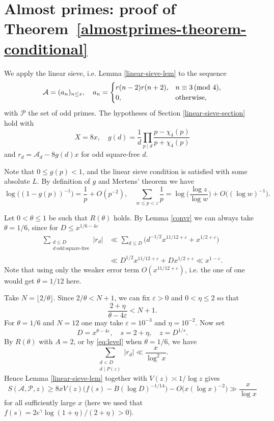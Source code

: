 \documentclass[12pt]{amsart}
\theoremstyle{remark}
\renewcommand{\pmod}[1]{\mkern3mu(\mathrm{mod}\ #1)}
\begin{document}
\section{Almost primes: proof of Theorem~\ref{almostprimes-theorem-conditional}}\label{sieve-section}

We apply the linear sieve, i.e. Lemma \ref{linear-sieve-lem} to the sequence
\[
    \mathcal A = (a_n)_{n \le x}, \quad a_n = \begin{cases}
                                                    r(n-2)r(n+2),&n \equiv 3 \pmod 4,\\ 0,&\text{otherwise},
                                                \end{cases}
\]
with $\mathcal P$ the set of odd primes. The hypotheses of Section \ref{linear-sieve-section} hold with
\[
    X = 8x,\quad g(d) = \frac{1}{d} \prod_{p \mid d}\frac{p-\chi_4(p)}{p+\chi_4(p)}
\]
and $r_d = \mathcal A_d-8g(d)x$ for odd square-free $d$.

Note that $0 \le g(p) < 1$, and the linear sieve condition is satisfied with some absolute $L$. 
By definition of $g$ and Mertens' theorem we have
\[
    \log\bigl((1-g(p))^{-1}\bigr) = \frac{1}{p}+O(p^{-2}), \quad \sum_{w \le p < z}\frac{1}{p} = \log\biggl(\frac{\log z}{\log w}\biggr)+O\bigl((\log w)^{-1}\bigr).
\]

Let $0 < \theta \le 1$ be such that $R(\theta)$ holds. By Lemma \ref{convr} we can always take $\theta = 1/6$, since for $D \le x^{1/6-4\varepsilon}$
\begin{equation}\label{eq:level}
    \begin{split}
        \sum_{\substack{d\le D\\ d\ \mathrm{odd\ square\text{-}free}}}|r_d| &\ll \sum_{d\le D}\big(d^{-1/2}x^{11/12+\varepsilon}+x^{1/2+\varepsilon}\big) \\
        &\ll D^{1/2}x^{11/12+\varepsilon}+Dx^{1/2+\varepsilon}\ll x^{1-\varepsilon}.
    \end{split}
\end{equation}
Note that using only the weaker error term $O(x^{11/12+\varepsilon})$, i.e. the one of \cite[Lemma 4.2]{MR2486486} one would get $\theta = 1/12$ here.

Take $N = \lfloor2/\theta \rfloor$. Since $2/\theta < N+1$, we can fix $\varepsilon>0$ and $0 < \eta \le 2$ so that
\[
    \frac{2 + \eta}{\theta - 4\varepsilon} < N+1 .
\]
For $\theta = 1/6$ and $N = 12$ one may take $\varepsilon = 10^{-3}$ and $\eta = 10^{-2}$. Now set
\[
    D = x^{\theta-4\varepsilon}, \quad s = 2+\eta,\quad z = D^{1/s}.
\]
By $R(\theta)$ with $A = 2$, or by \eqref{eq:level} when $\theta=1/6$, we have 
\[
    \sum_{\substack{d<D \\ d\mid P(z)}}|r_d| \ll \frac{x}{\log^2 x}.
\]
Hence Lemma \ref{linear-sieve-lem} together with $V(z) \asymp 1/\log z$ gives
\[
    S(\mathcal A,\mathcal P,z) \ge 8xV(z)\biggl(f(s)-B(\log D)^{-1/14} \biggr)-O\big(x(\log x)^{-2}\big)\gg\frac{x}{\log x}
\]
for all sufficiently large $x$ (here we used that $f(s) = 2e^\gamma\log(1+\eta)/(2+\eta) > 0$).
\end{document}
